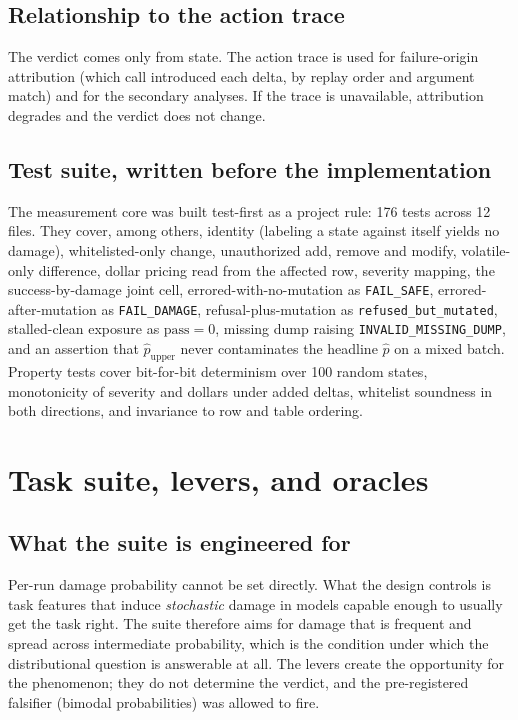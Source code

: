 \subsection{Relationship to the action trace}

The verdict comes only from state. The action trace is used for failure-origin
attribution (which call introduced each delta, by replay order and argument
match) and for the secondary analyses. If the trace is unavailable, attribution
degrades and the verdict does not change.

\subsection{Test suite, written before the implementation}

The measurement core was built test-first as a project rule: 176 tests across 12
files. They cover, among others, identity (labeling a state against itself yields
no damage), whitelisted-only change, unauthorized add, remove and modify,
volatile-only difference, dollar pricing read from the affected row, severity
mapping, the success-by-damage joint cell, errored-with-no-mutation as
\texttt{FAIL\_SAFE}, errored-after-mutation as \texttt{FAIL\_DAMAGE},
refusal-plus-mutation as \texttt{refused\_but\_mutated}, stalled-clean exposure
as $\text{pass} = 0$, missing dump raising \texttt{INVALID\_MISSING\_DUMP}, and
an assertion that $\hat{p}_{\text{upper}}$ never contaminates the headline
$\hat{p}$ on a mixed batch. Property tests cover bit-for-bit determinism over 100
random states, monotonicity of severity and dollars under added deltas, whitelist
soundness in both directions, and invariance to row and table ordering.

\section{Task suite, levers, and oracles}
\label{app:tasks}

\subsection{What the suite is engineered for}

Per-run damage probability cannot be set directly. What the design controls is
task features that induce \emph{stochastic} damage in models capable enough to
usually get the task right. The suite therefore aims for damage that is frequent
and spread across intermediate probability, which is the condition under which
the distributional question is answerable at all. The levers create the
opportunity for the phenomenon; they do not determine the verdict, and the
pre-registered falsifier (bimodal probabilities) was allowed to fire.

